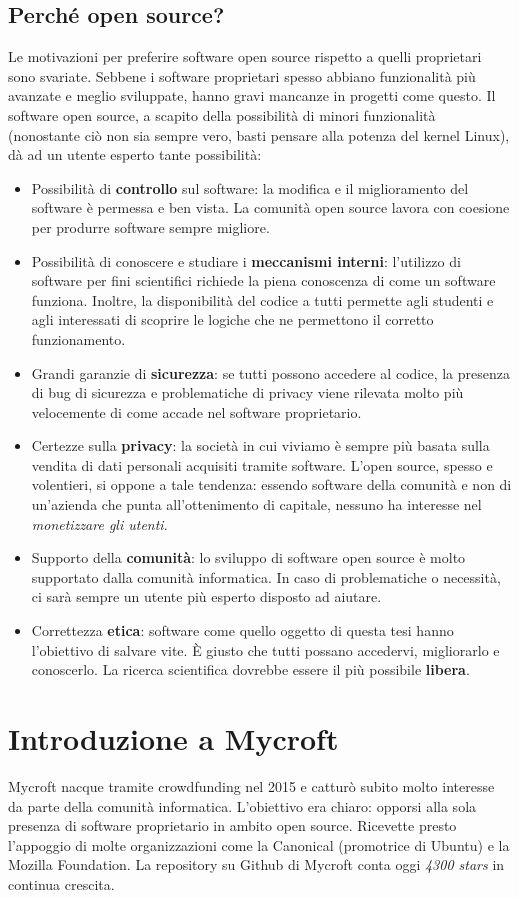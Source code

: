 \subsection{Perché open source?}
Le motivazioni per preferire software open source rispetto a quelli proprietari sono svariate. Sebbene i software proprietari spesso abbiano funzionalità più avanzate e meglio sviluppate, hanno gravi mancanze in progetti come questo. Il software open source, a scapito della possibilità di minori funzionalità (nonostante ciò non sia sempre vero, basti pensare alla potenza del kernel Linux), dà ad un utente esperto tante possibilità:
\begin{itemize}
    \item Possibilità di \textbf{controllo} sul software: la modifica e il miglioramento del software è permessa e ben vista. La comunità open source lavora con coesione per produrre software sempre migliore.
    \item Possibilità di conoscere e studiare i \textbf{meccanismi interni}: l'utilizzo di software per fini scientifici richiede la piena conoscenza di come un software funziona. Inoltre, la disponibilità del codice a tutti permette agli studenti e agli interessati di scoprire le logiche che ne permettono il corretto funzionamento.
    \item Grandi garanzie di \textbf{sicurezza}: se tutti possono accedere al codice, la presenza di bug di sicurezza e problematiche di privacy viene rilevata molto più velocemente di come accade nel software proprietario.
    \item Certezze sulla \textbf{privacy}: la società in cui viviamo è sempre più basata sulla vendita di dati personali acquisiti tramite software. L'open source, spesso e volentieri, si oppone a tale tendenza: essendo software della comunità e non di un'azienda che punta all'ottenimento di capitale, nessuno ha interesse nel \textit{monetizzare gli utenti}.
    \item Supporto della \textbf{comunità}: lo sviluppo di software open source è molto supportato dalla comunità informatica. In caso di problematiche o necessità, ci sarà sempre un utente più esperto disposto ad aiutare.
    \item Correttezza \textbf{etica}: software come quello oggetto di questa tesi hanno l'obiettivo di salvare vite. È giusto che tutti possano accedervi, migliorarlo e conoscerlo. La ricerca scientifica dovrebbe essere il più possibile \textbf{libera}.
\end{itemize}
\section{Introduzione a Mycroft}
Mycroft nacque tramite crowdfunding nel 2015 e catturò subito molto interesse da parte della comunità informatica. L'obiettivo era chiaro: opporsi alla sola presenza di software proprietario in ambito open source. Ricevette presto l'appoggio di molte organizzazioni come la Canonical (promotrice di Ubuntu) e la Mozilla Foundation. La repository su Github di Mycroft conta oggi \textit{4300 stars} in continua crescita.
